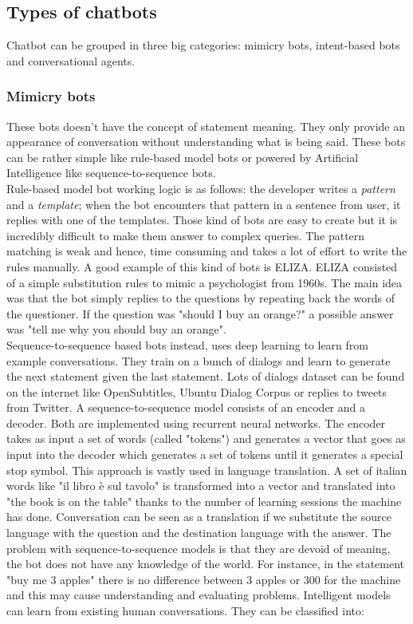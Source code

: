 \documentclass[b5paper,10pt,twoside,cucitura]{toptesi}
\begin{document}
\subsection{Types of chatbots}

Chatbot can be grouped in three big categories: mimicry bots, intent-based bots and conversational agents. 

\subsubsection{Mimicry bots}

These bots doesn't have the concept of statement meaning. They only provide an appearance of conversation without understanding what is being said. These bots can be rather simple like rule-based model bots or powered by Artificial Intelligence like sequence-to-sequence bots. 
\\
Rule-based model bot working logic is as follows:
the developer writes a \textit{pattern} and a \textit{template}; when the bot encounters that pattern in a sentence from user, it replies with one of the templates. Those kind of bots are easy to create but it is incredibly difficult to make them answer to complex queries. The pattern matching is weak and hence, time consuming and takes a lot of effort to write the rules manually. A good example of this kind of bots is ELIZA. ELIZA consisted of a simple substitution rules to mimic a psychologist from 1960s. The main idea was that the bot simply replies to the questions by repeating back the words of the questioner. If the question was "should I buy an orange?" a possible answer was "tell me why you should buy an orange". 
\\
Sequence-to-sequence based bots instead, uses deep learning to learn from example conversations. They train on a bunch of dialogs and learn to generate the next statement given the last statement. Lots of dialogs dataset can be found on the internet like OpenSubtitles, Ubuntu Dialog Corpus or replies to tweets from Twitter.
A sequence-to-sequence model consists of an encoder and a decoder. Both are implemented using recurrent neural networks. The encoder takes as input a set of words (called "tokens") and generates a vector that goes as input into the decoder which generates a set of tokens until it generates a special stop symbol. This approach is vastly used in language translation. A set of italian words like "il libro {\`e} sul tavolo" is transformed into a vector and translated into "the book is on the table" thanks to the number of learning sessions the machine has done. Conversation can be seen as a translation if we substitute the source language with the question and the destination language with the answer.
The problem with sequence-to-sequence models is that they are devoid of meaning, the bot does not have any knowledge of the world. For instance, in the statement "buy me 3 apples" there is no difference between 3 apples or 300 for the machine and this may cause understanding and evaluating problems.
Intelligent models can learn from existing human conversations. They can be classified into:
\end{document}
